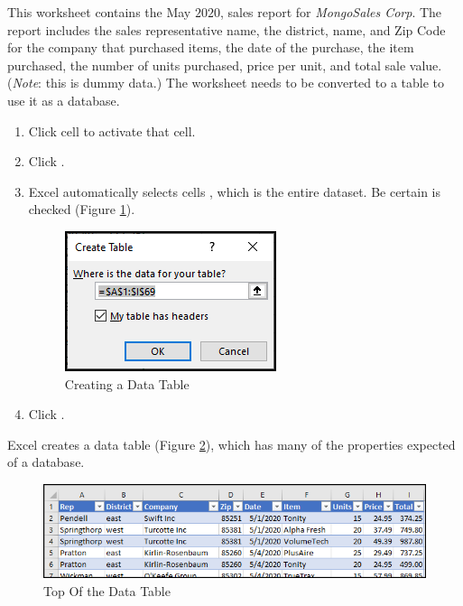 This worksheet contains the May $ 2020 $, sales report for \textit{MongoSales Corp}. The report includes the sales representative name, the district, name, and Zip Code for the company that purchased items, the date of the purchase, the item purchased, the number of units purchased, price per unit, and total sale value. (\textit{Note}: this is dummy data.) The worksheet needs to be converted to a table to use it as a database.

\begin{enumerate}[resume]
	\item Click cell  to activate that cell.
	\item Click .
	\item Excel automatically selects cells , which is the entire dataset. Be certain  is checked (Figure \ref{09:fig10}).

	\begin{figure}[H]
		\centering
		\includegraphics[width=\maxwidth{.50\linewidth}]{gfx/ch09_fig10}
		\caption{Creating a Data Table}
		\label{09:fig10}
	\end{figure}
	
	\item Click .
\end{enumerate}

Excel creates a data table (Figure \ref{09:fig11}), which has many of the properties expected of a database. 

\begin{figure}[H]
	\centering
	\includegraphics[width=\maxwidth{.95\linewidth}]{gfx/ch09_fig11}
	\caption{Top Of the Data Table}
	\label{09:fig11}
\end{figure}

